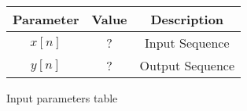 \centering
\begin{tabular}{|c|c|c|}
        \hline
        \textbf{Parameter} & \textbf{Value} & \textbf{Description} \\
        \hline
        $x[n]$ & ? & Input Sequence \\
        \hline
        $y[n]$ & ? & Output Sequence \\
        \hline
\end{tabular}
\caption{Input parameters table}
\label{tab:GATE.2023.BM.26.1}




